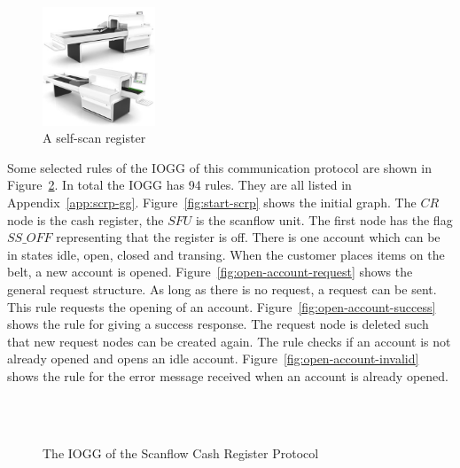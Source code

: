\begin{figure}[ht]
  \begin{center}
    \includegraphics[width=0.3\textwidth]{scanflow.jpg}
  \end{center}
  \caption{A self-scan register}
  \label{fig:register}
\end{figure}

Some selected rules of the IOGG of this communication protocol are shown in Figure~\ref{fig:gg-scrp}. In total the IOGG has 94 rules. They are all listed in Appendix~\ref{app:scrp-gg}. Figure~\ref{fig:start-scrp} shows the initial graph. The $CR$ node is the cash register, the $SFU$ is the scanflow unit. The first node has the flag $\mathit{SS\_OFF}$ representing that the register is off. There is one account which can be in states idle, open, closed and transing. When the customer places items on the belt, a new account is opened. Figure~\ref{fig:open-account-request} shows the general request structure. As long as there is no request, a request can be sent. This rule requests the opening of an account. Figure~\ref{fig:open-account-success} shows the rule for giving a success response. The request node is deleted such that new request nodes can be created again. The rule checks if an account is not already opened and opens an idle account. Figure~\ref{fig:open-account-invalid} shows the rule for the error message received when an account is already opened. 

\begin{figure}[ht]
  \begin{center}
    \hspace{20px}
    \\
    \hspace{20px}
    \\
    \hspace{20px}
  \end{center}
  \caption{The IOGG of the Scanflow Cash Register Protocol}
  \label{fig:gg-scrp}
\end{figure}

